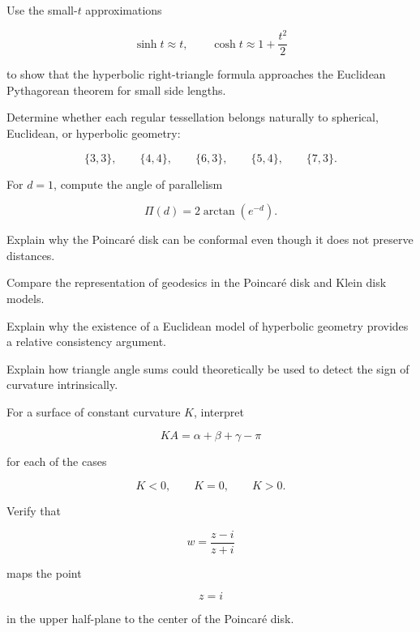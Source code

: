 \begin{exercise}[3]
Use the small-\(t\) approximations

\[
\sinh t\approx t,
\qquad
\cosh t\approx1+\frac{t^2}{2}
\]

to show that the hyperbolic right-triangle formula approaches the Euclidean
Pythagorean theorem for small side lengths.
\end{exercise}

\begin{exercise}[3]
Determine whether each regular tessellation belongs naturally to spherical,
Euclidean, or hyperbolic geometry:

\[
\{3,3\},
\qquad
\{4,4\},
\qquad
\{6,3\},
\qquad
\{5,4\},
\qquad
\{7,3\}.
\]
\end{exercise}

\begin{exercise}[3]
For \(d=1\), compute the angle of parallelism

\[
\Pi(d)=2\arctan(e^{-d}).
\]
\end{exercise}

\begin{exercise}[3]
Explain why the Poincar\'e disk can be conformal even though it does not
preserve distances.
\end{exercise}

\begin{exercise}[3]
Compare the representation of geodesics in the Poincar\'e disk and Klein
disk models.
\end{exercise}

\begin{exercise}[3]
Explain why the existence of a Euclidean model of hyperbolic geometry
provides a relative consistency argument.
\end{exercise}

\begin{exercise}[3]
Explain how triangle angle sums could theoretically be used to detect the
sign of curvature intrinsically.
\end{exercise}

\begin{exercise}[3]
For a surface of constant curvature \(K\), interpret

\[
KA=\alpha+\beta+\gamma-\pi
\]

for each of the cases

\[
K<0,\qquad K=0,\qquad K>0.
\]
\end{exercise}

\begin{exercise}[4]
Verify that

\[
w=\frac{z-i}{z+i}
\]

maps the point

\[
z=i
\]

in the upper half-plane to the center of the Poincar\'e disk.
\end{exercise}

